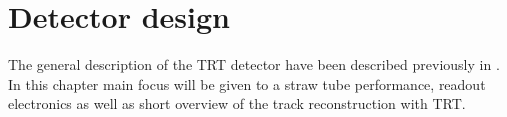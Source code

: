 \section{Detector design}
\label{sec:trt_straw_hw}

The general description of the TRT detector have been described previously in .
In this chapter main focus will be given to a straw tube performance, readout electronics as well as 
short overview of the track reconstruction with TRT.






